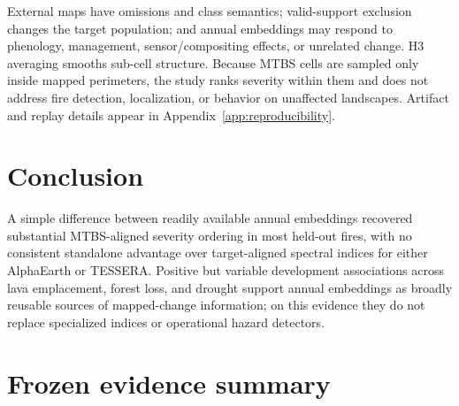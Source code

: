 \documentclass{article}
\begin{document}
External maps have omissions and class semantics; valid-support exclusion
changes the target population; and annual embeddings may respond to phenology,
management, sensor/compositing effects, or unrelated change. H3 averaging
smooths sub-cell structure. Because MTBS cells are sampled only inside mapped
perimeters, the study ranks severity within them and does not address fire
detection, localization, or behavior on unaffected landscapes. Artifact and
replay details appear in Appendix~\ref{app:reproducibility}.

\section{Conclusion}

A simple difference between readily available annual embeddings recovered
substantial MTBS-aligned severity ordering in most held-out fires, with no
consistent standalone advantage over target-aligned spectral indices for
either AlphaEarth or TESSERA. Positive but variable development associations
across lava emplacement, forest loss, and drought support annual embeddings as
broadly reusable sources of mapped-change information; on this evidence they
do not replace specialized indices or operational hazard detectors.

\clearpage



\clearpage
\appendix

\section{Frozen evidence summary}
\label{app:evidence}
\end{document}
